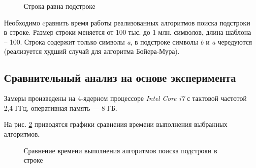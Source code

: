 \documentclass[a4paper,12pt]{article}
\begin{document}
\begin{figure}[h!]
	\caption{
		Строка равна подстроке}
	\label{fig:t6}
\end{figure}


\pagebreak


Необходимо cравнить время работы реализованных алгоритмов
поиска подстроки в строке. Размер строки меняется от 100 тыс.
до 1 млн. символов, длина шаблона -- 100.
Строка содержит только символы \textit{a},
в подстроке символы \textit{b} и \textit{a}
чередуются (реализуется худший случай для
алгоритма Бойера-Мура).

\subsection{Сравнительный анализ на основе эксперимента}

Замеры произведены на 4-ядерном процессоре \textit{Intel Core i7}
с тактовой частотой 2,4 ГГц, оперативная память --- 8 ГБ.

На рис. \ref{fig:chart_substr} приводятся графики сравнения времени выполнения выбранных алгоритмов.

\begin{figure}[h!]
	\caption{Сравнение времени выполнения алгоритмов поиска подстроки в строке}
	\label{fig:chart_substr}
\end{figure}
\end{document}
